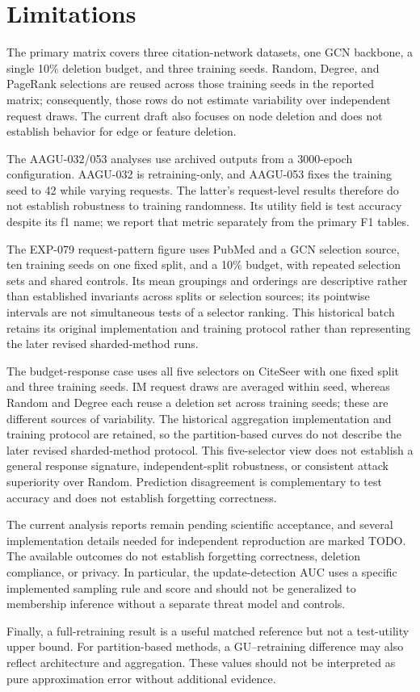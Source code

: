 \section{Limitations}
\label{sec:limitations}

The primary matrix covers three citation-network datasets, one GCN backbone, a single 10\% deletion budget, and three training seeds. Random, Degree, and PageRank selections are reused across those training seeds in the reported matrix; consequently, those rows do not estimate variability over independent request draws. The current draft also focuses on node deletion and does not establish behavior for edge or feature deletion.

The AAGU-032/053 analyses use archived outputs from a 3000-epoch configuration. AAGU-032 is retraining-only, and AAGU-053 fixes the training seed to 42 while varying requests. The latter's request-level results therefore do not establish robustness to training randomness. Its utility field is test accuracy despite its f1 name; we report that metric separately from the primary F1 tables.

The EXP-079 request-pattern figure uses PubMed and a GCN selection source, ten training seeds on one fixed split, and a 10\% budget, with repeated selection sets and shared controls. Its mean groupings and orderings are descriptive rather than established invariants across splits or selection sources; its pointwise intervals are not simultaneous tests of a selector ranking. This historical batch retains its original implementation and training protocol rather than representing the later revised sharded-method runs.

The budget-response case uses all five selectors on CiteSeer with one fixed split and three training seeds. IM request draws are averaged within seed, whereas Random and Degree each reuse a deletion set across training seeds; these are different sources of variability. The historical aggregation implementation and training protocol are retained, so the partition-based curves do not describe the later revised sharded-method protocol. This five-selector view does not establish a general response signature, independent-split robustness, or consistent attack superiority over Random. Prediction disagreement is complementary to test accuracy and does not establish forgetting correctness.

The current analysis reports remain pending scientific acceptance, and several implementation details needed for independent reproduction are marked TODO. The available outcomes do not establish forgetting correctness, deletion compliance, or privacy. In particular, the update-detection AUC uses a specific implemented sampling rule and score and should not be generalized to membership inference without a separate threat model and controls.

Finally, a full-retraining result is a useful matched reference but not a test-utility upper bound. For partition-based methods, a GU--retraining difference may also reflect architecture and aggregation. These values should not be interpreted as pure approximation error without additional evidence.
